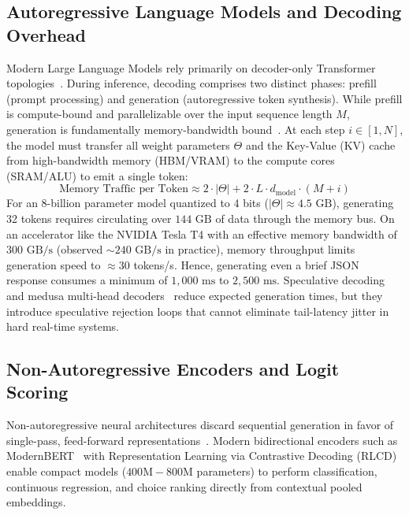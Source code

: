 \documentclass[journal,compsoc]{IEEEtran}
\begin{document}
\subsection{Autoregressive Language Models and Decoding Overhead}
Modern Large Language Models rely primarily on decoder-only Transformer topologies~\cite{vaswani2017attention}. During inference, decoding comprises two distinct phases: prefill (prompt processing) and generation (autoregressive token synthesis). While prefill is compute-bound and parallelizable over the input sequence length $M$, generation is fundamentally memory-bandwidth bound~\cite{aminabadi2022deepspeed}. At each step $i \in [1, N]$, the model must transfer all weight parameters $\Theta$ and the Key-Value (KV) cache from high-bandwidth memory (HBM/VRAM) to the compute cores (SRAM/ALU) to emit a single token:
\begin{equation}
\text{Memory Traffic per Token} \approx 2 \cdot |\Theta| + 2 \cdot L \cdot d_{\text{model}} \cdot (M + i)
\end{equation}
For an 8-billion parameter model quantized to 4 bits ($|\Theta| \approx 4.5 \text{ GB}$), generating 32 tokens requires circulating over $144 \text{ GB}$ of data through the memory bus. On an accelerator like the NVIDIA Tesla T4 with an effective memory bandwidth of $300 \text{ GB/s}$ (observed $\sim 240 \text{ GB/s}$ in practice), memory throughput limits generation speed to $\approx 30$ tokens/s. Hence, generating even a brief JSON response consumes a minimum of $1,000 \text{ ms}$ to $2,500 \text{ ms}$. Speculative decoding~\cite{leviathan2023fast} and medusa multi-head decoders~\cite{cai2024medusa} reduce expected generation times, but they introduce speculative rejection loops that cannot eliminate tail-latency jitter in hard real-time systems.

\subsection{Non-Autoregressive Encoders and Logit Scoring}
Non-autoregressive neural architectures discard sequential generation in favor of single-pass, feed-forward representations~\cite{gu2018nonautoregressive}. Modern bidirectional encoders such as ModernBERT~\cite{warner2024modernbert} with Representation Learning via Contrastive Decoding (RLCD) enable compact models ($400\text{M} - 800\text{M}$ parameters) to perform classification, continuous regression, and choice ranking directly from contextual pooled embeddings.
\end{document}
